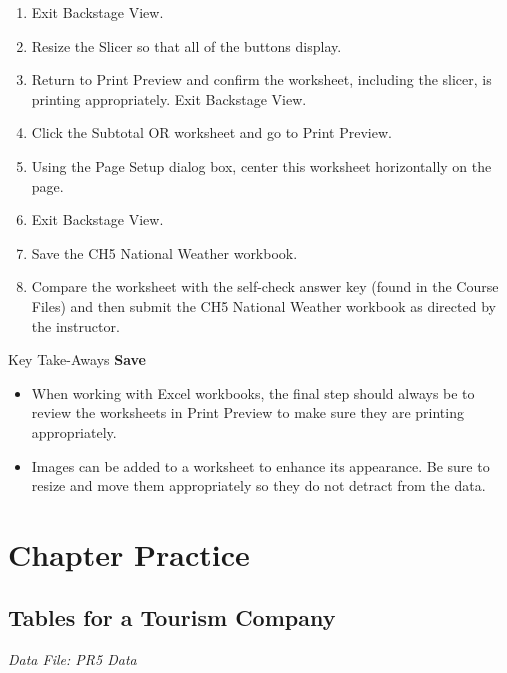 \begin{enumerate}
	\item Exit Backstage View.
	\item Resize the Slicer so that all of the buttons display.
	\item Return to Print Preview and confirm the worksheet, including the slicer, is printing appropriately. Exit Backstage View.
	\item Click the Subtotal OR worksheet and go to Print Preview.
	\item Using the Page Setup dialog box, center this worksheet horizontally on the page. 
	\item Exit Backstage View.
	\item Save the CH5 National Weather workbook.
	\item Compare the worksheet with the self-check answer key (found in the Course Files) and then submit the CH5 National Weather workbook as directed by the instructor.
\end{enumerate}

\begin{center}
	\begin{tkwbox}{Key Take-Aways}
		\textbf{Save}
		\\
		\begin{itemize}
			\setlength{\itemsep}{0pt}
			\setlength{\parskip}{0pt}
			\setlength{\parsep}{0pt}

			\item When working with Excel workbooks, the final step should always be to review the worksheets in Print Preview to make sure they are printing appropriately.
			\item Images can be added to a worksheet to enhance its appearance. Be sure to resize and move them appropriately so they do not detract from the data.

		\end{itemize}
	\end{tkwbox}
\end{center}

\section{Chapter Practice}

\subsection{Tables for a Tourism Company}

\textit{Data File: PR5 Data}

